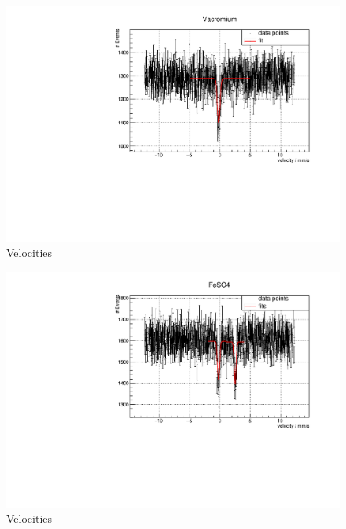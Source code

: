 \begin{figure}
\label{fig:vc}
\centering
\includegraphics[scale = 0.5]{../plots/VC.pdf}
\caption{Velocities}
\end{figure}


\begin{figure}
\label{fig:fes}
\centering
\includegraphics[scale = 0.5]{../plots/FeSO4.pdf}
\caption{Velocities}
\end{figure}


